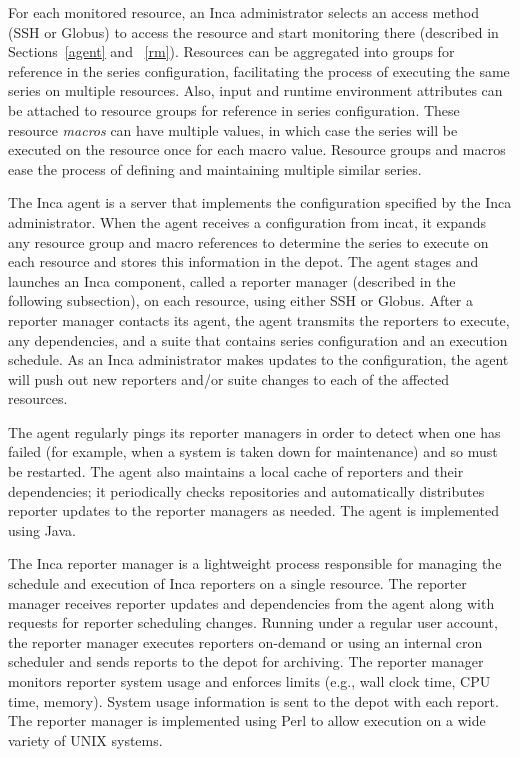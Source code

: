 \documentclass[times,10pt,twocolumn]{article}
\begin{document}
For each monitored resource, an Inca administrator selects an access method
(SSH or Globus) to access the resource and start monitoring there (described
in Sections~\ref{agent} and ~\ref{rm}).  Resources can be aggregated into
groups for reference in the series configuration, facilitating the
process of executing the same series on multiple resources.  Also,
input and runtime environment attributes can be attached to resource groups
for reference in series configuration.
These resource \emph{macros} can have multiple values, in which
case the series will be executed on the resource once for each macro value.
Resource groups and macros ease the process of defining and maintaining
multiple similar series.

\label{agent}

The Inca agent is a server that implements the configuration specified by the
Inca administrator.  When the agent receives a configuration from incat,
it expands any resource group and macro references to determine
the series to execute on each resource and stores this
information in the depot.  The agent stages and
launches an Inca component, called a reporter manager (described in the
following subsection), on each resource, using either SSH or Globus.  After a
reporter manager contacts its agent, the agent transmits the reporters to
execute, any dependencies, and a suite that contains series
configuration and an execution schedule.  As an Inca administrator makes
updates to the configuration, the agent will push out new reporters and/or
suite changes to each of the affected resources.

The agent regularly pings its reporter managers in order to detect when one has
failed (for example, when a system is taken down for maintenance) and so must
be restarted.  The agent also maintains a local cache of reporters and their
dependencies; it periodically checks repositories
and automatically distributes reporter updates to the reporter managers as
needed.  The agent is implemented using Java. 

\label{rm}

The Inca reporter manager is a lightweight process responsible for managing
the schedule and execution of Inca reporters on a single resource. The
reporter manager receives reporter updates and dependencies from the agent
along with requests for reporter scheduling changes.  Running under a regular
user account, the reporter manager executes reporters on-demand or using an
internal cron scheduler and sends reports to the depot for archiving. The
reporter manager monitors reporter system usage 
and enforces limits (e.g., wall clock time, CPU time, memory).
System usage information is sent to the depot with each report. 
The reporter manager is implemented using Perl to allow execution on
a wide variety of UNIX systems.
\end{document}
